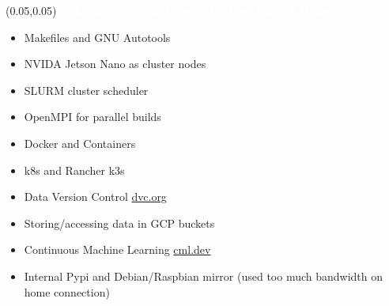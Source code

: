 \documentclass[aspectratio=169]{beamer} %
\begin{document}
\begin{frame}{}
    \setlength{\TPHorizModule}{\textwidth}
    \setlength{\TPVertModule}{\textwidth}
    \begin{textblock}{0.74} (0.05,0.05)
        \bfseries\large\textcolor{white}{Yak Shaving, Side Quests, Endless Rabbit Holes}
    \end{textblock}
    \begin{itemize}
        \item Makefiles and GNU Autotools
        \item NVIDA Jetson Nano as cluster nodes
        \item SLURM cluster scheduler
        \item OpenMPI for parallel builds
        \item Docker and Containers
        \item k8s and Rancher k3s
        \item Data Version Control \href{https://dvc.org}{dvc.org}
        \item Storing/accessing data in GCP buckets
        \item Continuous Machine Learning \href{https://cml.dev/}{cml.dev}
        \item Internal Pypi and Debian/Raspbian mirror (used too much bandwidth on home connection)
    \end{itemize}
\end{frame}

\end{document}
